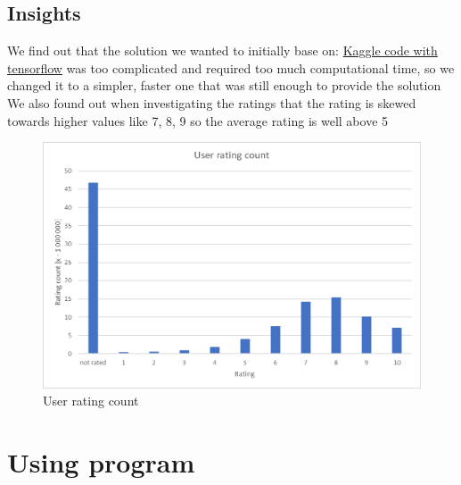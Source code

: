 \documentclass[12pt]{article}
\begin{document}
\subsection{Insights}
We find out that the solution we wanted to initially base on: \href{https://www.kaggle.com/code/chaitanya99/recommendation-system-cf-anime}{Kaggle code with tensorflow} was too complicated and required too much computational time, so we changed it to a simpler, faster one that was still enough to provide the solution \\ 
We also found out when investigating the ratings that the rating is skewed towards higher values like 7, 8, 9 so the average rating is well above 5 
\begin{figure}[H]
  \caption{User rating count}
  \includegraphics[width=\textwidth]{user_rating.png}
\end{figure}

\section{Using program} 
\end{document}
